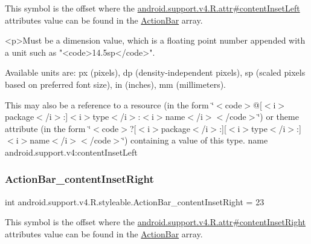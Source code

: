 This symbol is the offset where the \hyperlink{classandroid_1_1support_1_1v4_1_1R_1_1attr_ae2b4db4a6417ce171035f616b2fa4d20}{android.\+support.\+v4.\+R.\+attr\#content\+Inset\+Left} attribute\textquotesingle{}s value can be found in the \hyperlink{classandroid_1_1support_1_1v4_1_1R_1_1styleable_adc5a3492b9c46265760d7120a04d6afa}{Action\+Bar} array.

\begin{DoxyVerb}      <p>Must be a dimension value, which is a floating point number appended with a unit such as "<code>14.5sp</code>".
\end{DoxyVerb}
 Available units are\+: px (pixels), dp (density-\/independent pixels), sp (scaled pixels based on preferred font size), in (inches), mm (millimeters). 

This may also be a reference to a resource (in the form \char`\"{}$<$code$>$@\mbox{[}$<$i$>$package$<$/i$>$\+:\mbox{]}$<$i$>$type$<$/i$>$\+:$<$i$>$name$<$/i$>$$<$/code$>$\char`\"{}) or theme attribute (in the form \char`\"{}$<$code$>$?\mbox{[}$<$i$>$package$<$/i$>$\+:\mbox{]}\mbox{[}$<$i$>$type$<$/i$>$\+:\mbox{]}$<$i$>$name$<$/i$>$$<$/code$>$\char`\"{}) containing a value of this type.  name android.\+support.\+v4\+:content\+Inset\+Left \mbox{\label{classandroid_1_1support_1_1v4_1_1R_1_1styleable_a3bef2a0708d9a976e79efa23e5327187}} 
\subsubsection{\texorpdfstring{Action\+Bar\+\_\+content\+Inset\+Right}{ActionBar\_contentInsetRight}}
{\footnotesize\ttfamily int android.\+support.\+v4.\+R.\+styleable.\+Action\+Bar\+\_\+content\+Inset\+Right = 23\hspace{0.3cm}{\ttfamily [static]}}

This symbol is the offset where the \hyperlink{classandroid_1_1support_1_1v4_1_1R_1_1attr_aae1b287277312b537031bed0d24863b0}{android.\+support.\+v4.\+R.\+attr\#content\+Inset\+Right} attribute\textquotesingle{}s value can be found in the \hyperlink{classandroid_1_1support_1_1v4_1_1R_1_1styleable_adc5a3492b9c46265760d7120a04d6afa}{Action\+Bar} array.

